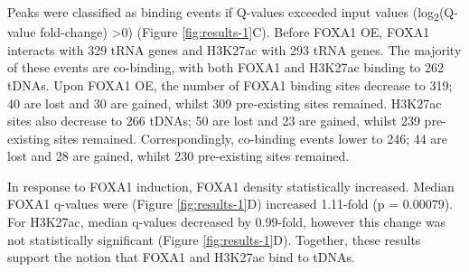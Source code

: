 \documentclass[
  12pt,
]{article}
\begin{document}
Peaks were classified as binding events if Q-values exceeded input values (log\textsubscript{2}(Q-value fold-change) \textgreater0) (Figure \ref{fig:results-1}C).
Before FOXA1 OE, FOXA1 interacts with 329 tRNA genes and H3K27ac with 293 tRNA genes.
The majority of these events are co-binding, with both FOXA1 and H3K27ac binding to 262 tDNAs.
Upon FOXA1 OE, the number of FOXA1 binding sites decrease to 319; 40 are lost and 30 are gained, whilst 309 pre-existing sites remained.
H3K27ac sites also decrease to 266 tDNAs; 50 are lost and 23 are gained, whilst 239 pre-existing sites remained.
Correspondingly, co-binding events lower to 246; 44 are lost and 28 are gained, whilst 230 pre-existing sites remained.

In response to FOXA1 induction, FOXA1 density statistically increased.
Median FOXA1 q-values were (Figure \ref{fig:results-1}D) increased 1.11-fold (p = 0.00079).
For H3K27ac, median q-values decreased by 0.99-fold, however this change was not statistically significant (Figure \ref{fig:results-1}D).
Together, these results support the notion that FOXA1 and H3K27ac bind to tDNAs.
\end{document}
